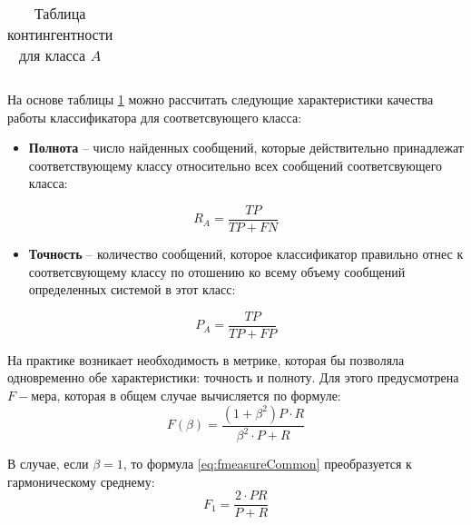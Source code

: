     \begin{table}[ht]
        \centering
        \caption{Таблица контингентности для класса $A$}
        \label{table:contingent}
        \begin{tabular}{|l|}
            \hline
             \\ \hline
         \end{tabular}
     \end{table}

     На основе таблицы \ref{table:contingent} можно рассчитать следующие
     характеристики качества работы классификатора для соответсвующего класса:
    \begin{itemize}
        \item {\bf Полнота} -- число найденных сообщений, которые
            действительно принадлежат соответствующему классу относительно всех
            сообщений соответсвующего класса:

            \begin{equation}
                \label{eq:recall}
                R_A = \dfrac{TP}{TP + FN} \hspace{20pt}
            \end{equation}

        \item {\bf Точность} -- количество сообщений, которое
            классификатор правильно отнес к соответсвующему классу по отошению
            ко всему объему сообщений определенных системой в этот класс:

            \begin{equation}
                \label{eq:precision}
                P_A = \dfrac{TP}{TP + FP} \hspace{20pt}
            \end{equation}
    \end{itemize}

        На практике возникает необходимость в метрике, которая бы позволяла одновременно
    обе характеристики: точность и полноту. Для этого предусмотрена $F-мера$, которая
    в общем случае вычисляется по формуле:
    \begin{equation}
        \label{eq:fmeasureCommon}
        F(\beta) = \dfrac{(1+\beta^2) P \cdot R}{\beta^2 \cdot P + R}
    \end{equation}

    В случае, если $\beta = 1$, то формула \ref{eq:fmeasureCommon} преобразуется
    к гармоническому среднему:
    \begin{equation}
        \label{eq:fmeasure}
        F_1 = \dfrac{2 \cdot P R}{P + R}
    \end{equation}


